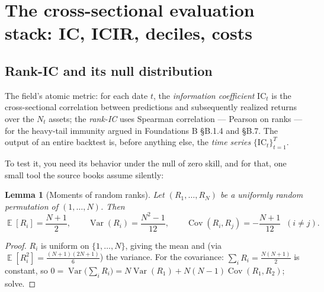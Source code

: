\documentclass[11pt]{article}
\numberwithin{equation}{section}
\theoremstyle{plain}
\newtheorem{lemma}[theorem]{Lemma}
\theoremstyle{definition}
\theoremstyle{remark}
\DeclareMathOperator{\E}{\mathbb{E}}
\DeclareMathOperator{\Var}{Var}
\DeclareMathOperator{\Cov}{Cov}
\newcommand{\IC}{\mathrm{IC}}
\begin{document}
\section{The cross-sectional evaluation stack: IC, ICIR, deciles, costs}\label{sec:ic}

\subsection{Rank-IC and its null distribution}

The field's atomic metric: for each date $t$, the \emph{information coefficient} $\IC_t$ is the cross-sectional correlation between predictions and subsequently realized returns over the $N_t$ assets; the \emph{rank-IC} uses Spearman correlation --- Pearson on ranks --- for the heavy-tail immunity argued in Foundations B \S B.1.4 and \S B.7. The output of an entire backtest is, before anything else, the \emph{time series} $\{\IC_t\}_{t=1}^T$.

To test it, you need its behavior under the null of zero skill, and for that, one small tool the source books assume silently:

\begin{lemma}[Moments of random ranks]\label{lem:ranks}
Let $(R_1, \dots, R_N)$ be a uniformly random permutation of $(1, \dots, N)$. Then
\[
\E[R_i] = \frac{N+1}{2},
\qquad
\Var(R_i) = \frac{N^2 - 1}{12},
\qquad
\Cov(R_i, R_j) = -\frac{N+1}{12} \;\; (i \ne j).
\]
\end{lemma}
\begin{proof}
$R_i$ is uniform on $\{1,\dots,N\}$, giving the mean and (via $\E[R_i^2] = \tfrac{(N+1)(2N+1)}{6}$) the variance. For the covariance: $\sum_i R_i = \tfrac{N(N+1)}{2}$ is constant, so $0 = \Var\big(\sum_i R_i\big) = N\Var(R_1) + N(N-1)\Cov(R_1, R_2)$; solve.
\end{proof}
\end{document}
